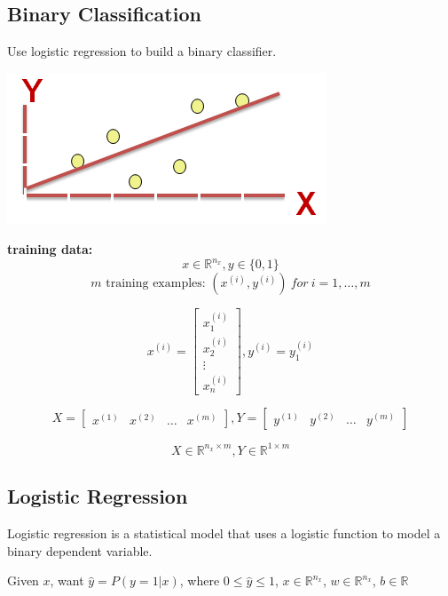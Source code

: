 \documentclass{article}
\begin{document}
\subsection{Binary Classification}

Use logistic regression to build a binary classifier.

\begin{center}
\includegraphics[scale=0.4]{./images/binary_classification.png}
\end{center}

\noindent \textbf{training data:}
\[x \in \mathbb{R}^{n_x}, y \in \{0, 1\}\]
\[\text{\(m\) training examples: } (x^{(i)}, y^{(i)})\:for\:i = 1, \dots, m\]

\[
x^{(i)} = 
\begin{bmatrix}
x^{(i)}_1\\
x^{(i)}_2\\
\vdots\\
x^{(i)}_n
\end{bmatrix}
,
y^{(i)} = y^{(i)}_1
\]

\[X =
\begin{bmatrix}
x^{(1)} & x^{(2)} & \dots & x^{(m)}
\end{bmatrix}
,
Y =
\begin{bmatrix}
y^{(1)} & y^{(2)} & \dots & y^{(m)}
\end{bmatrix}
\]

\[X \in \mathbb{R}^{n_x \times m}, Y \in \mathbb{R}^{1 \times m}\]

\subsection{Logistic Regression}

\noindent Logistic regression is a statistical model that uses a logistic function to model a binary dependent variable.

\bigskip

\noindent Given \(x\), want \(\hat{y} = P(y = 1 | x)\), where \(0 \leq \hat{y} \leq 1\), \(x \in \mathbb{R}^{n_x}\), \(w \in \mathbb{R}^{n_x}\), \(b \in \mathbb{R}\)
\end{document}
